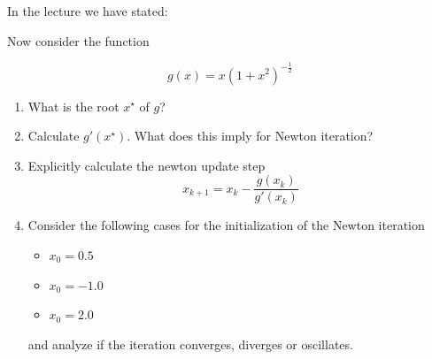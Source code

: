     In the lecture we have stated:


    Now consider the function

    \begin{equation}
        g(x) = x(1+x^2)^{-\frac{1}{2}}
    \end{equation}

    \begin{enumerate}
        \item What is the root $x^\star$ of $g$?
        \item Calculate $g'(x^\star)$. What does this imply for Newton iteration?
        \item Explicitly calculate the newton update step
        \begin{equation}
            x_{k+1} = x_{k} - \frac{g(x_k)}{g'(x_k)}
        \end{equation}
        \item Consider the following cases for the initialization of 
        the Newton iteration
        \begin{itemize}
            \item $x_0 = 0.5$
            \item $x_0 = -1.0$
            \item $x_0 = 2.0$
        \end{itemize}
        and analyze if the iteration converges, diverges or oscillates.
    \end{enumerate}


\pagebreak
